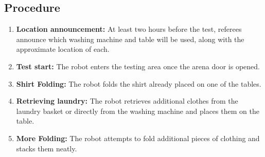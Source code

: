 \subsection*{Procedure}
\begin{enumerate}[nosep]
    \item \textbf{Location announcement:} At least two hours before the test, referees announce which washing machine and table will be used, along with the approximate location of each.
    \item \textbf{Test start:} The robot enters the testing area once the arena door is opened.
    \item \textbf{Shirt Folding:} The robot folds the shirt already placed on one of the tables.
    \item \textbf{Retrieving laundry:} The robot retrieves additional clothes from the laundry basket or directly from the washing machine and places them on the table.
    \item \textbf{More Folding:} The robot attempts to fold additional pieces of clothing and stacks them neatly.
\end{enumerate}

